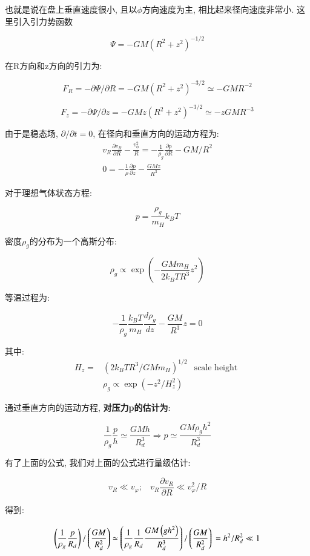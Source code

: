 \documentclass[fontset=windows]{report}
\begin{document}
也就是说在盘上垂直速度很小, 且以\(\phi\)方向速度为主,
相比起来径向速度非常小. 这里引入引力势函数

\[\Psi=-GM(R^2+z^2)^{-1/2}\]

在R方向和z方向的引力为:

\[F_R=-\partial \Psi/\partial R=-GM(R^2+z^2)^{-3/2}\simeq -GMR^{-2}\]

\[F_z=-\partial \Psi/\partial z = -GMz(R^2+z^2)^{-3/2}\simeq -zGMR^{-3}\]

由于是稳态场, \(\partial/\partial t=0\), 在径向和垂直方向的运动方程为:
\begin{equation}
  \begin{array}{c}
    v_R\frac{\partial v_R}{\partial R}-\frac{v^2_\phi}{R}=-\frac 1 {\rho_g}\frac{\partial p}{\partial R}-GM/R^2\\
    0=-\frac1\rho \frac{\partial p}{\partial z}-\frac{GMz}{R^3}
    \end{array}
\end{equation}


对于理想气体状态方程:

\[p=\frac{\rho_g}{m_H}k_B T\]

密度\(\rho_g\)的分布为一个高斯分布:

\[\rho_{g} \propto \exp \left(-\frac{G M m_{H}}{2 k_{B} T R^{3}} z^{2}\right)\]

等温过程为:

\[-\frac1{\rho_g}\frac{k_B T}{m_H}\frac{d\rho_g}{dz}-\frac{GM}{R^3}z=0\]

其中:
\begin{equation}
  \begin{array}{cr}
    H_{z}=&\left(2 k_{B} T R^{3} / G M m_{H}\right)^{1 / 2} \ \ 
    \text { scale height } \\& \rho_{g} \propto \exp \left(-z^{2} / H_{z}^{2}\right)
  \end{array}
\end{equation}

通过垂直方向的运动方程, \textbf{对压力p的估计为}:

\[\frac{1}{\rho_g} \frac{p}{h} \simeq \frac{G M h}{R_{d}^{3}} \Rightarrow p \simeq \frac{G M \rho_{g} h^{2}}{R_{d}^{3}}\]

有了上面的公式, 我们对上面的公式进行量级估计:

\[v_R \ll v_\varphi;\ \ \ \ v_R\frac{\partial v_R}{\partial R}\ll v_\varphi^2/R\]

得到:

\[\left(\frac{1}{\rho _g} \frac{p}{R_{d}}\right)  /\left(\frac{G M}{R_{d}^{2}}\right) \simeq\left(\frac{1}{\rho_{g}} \frac{1}{R_{d}} \frac{G M\left(g h^{2}\right)}{R_{d}^{3}}\right) /\left(\frac{G M}{R_{d}^{2}}\right)\\=h^{2} / R_{d}^{2}\ll1\]
\end{document}
